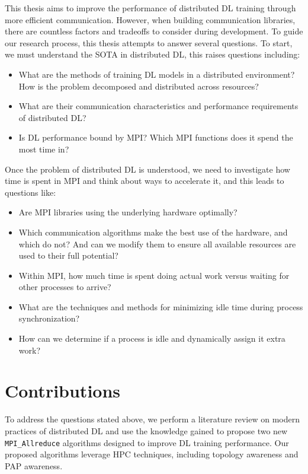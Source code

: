 This thesis aims to improve the performance of distributed \gls{DL} training through more efficient communication.
However, when building communication libraries, there are countless factors and tradeoffs to consider during development.
To guide our research process, this thesis attempts to answer several questions.
To start, we must understand the \gls{SOTA} in distributed \gls{DL}, this raises questions including:
\begin{itemize}
    \item What are the methods of training \gls{DL} models in a distributed environment? How is the problem decomposed and distributed across resources?
    \item What are their communication characteristics and performance requirements of distributed \gls{DL}? 
    \item Is \gls{DL} performance bound by \gls{MPI}? Which \gls{MPI} functions does it spend the most time in?
\end{itemize}
Once the problem of distributed \gls{DL} is understood, we need to investigate how time is spent in \gls{MPI} and think about ways to accelerate it, and this leads to questions like:
\begin{itemize}
    \item Are \gls{MPI} libraries using the underlying hardware optimally? 
    \item Which communication algorithms make the best use of the hardware, and which do not? And can we modify them to ensure all available resources are used to their full potential? 
    \item Within \gls{MPI}, how much time is spent doing actual work versus waiting for other processes to arrive?
    \item What are the techniques and methods for minimizing idle time during process synchronization?
    \item How can we determine if a process is idle and dynamically assign it extra work? 
\end{itemize}

\section{Contributions}
To address the questions stated above, we perform a literature review on modern practices of distributed \gls{DL} and use the knowledge gained to propose two new \texttt{MPI\_Allreduce} algorithms designed to improve \gls{DL} training performance.
Our proposed algorithms leverage \gls{HPC} techniques, including topology awareness and \gls{PAP} awareness. 

